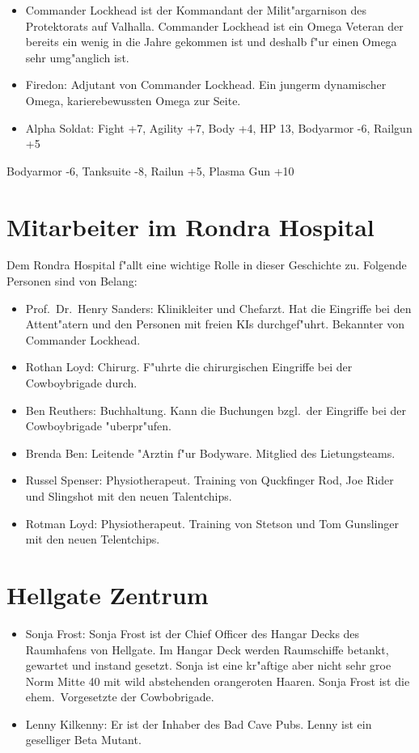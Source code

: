 \begin{itemize}
    \item Commander Lockhead ist der Kommandant der Milit"argarnison des Protektorats auf Valhalla. Commander Lockhead ist ein Omega Veteran der bereits ein wenig in die Jahre gekommen ist und deshalb f"ur einen Omega sehr umg"anglich ist. 
    \item Firedon: Adjutant von Commander Lockhead. Ein jungerm dynamischer Omega, karierebewussten Omega zur Seite.
    \item Alpha Soldat: Fight +7, Agility +7, Body +4, HP 13, Bodyarmor -6, Railgun +5
\end{itemize}

Bodyarmor -6, Tanksuite -8, Railun +5, Plasma Gun +10

\section{Mitarbeiter im Rondra Hospital}

Dem Rondra Hospital f"allt eine wichtige Rolle in dieser Geschichte zu. Folgende Personen sind von Belang:

\begin{itemize}
    \item Prof.~Dr.~Henry Sanders: Klinikleiter und Chefarzt. Hat die Eingriffe bei den Attent"atern und den Personen mit freien KIs durchgef"uhrt. Bekannter von Commander Lockhead.
    \item Rothan Loyd: Chirurg. F"uhrte die chirurgischen Eingriffe bei der Cowboybrigade durch.
    \item Ben Reuthers: Buchhaltung. Kann die Buchungen bzgl.~der Eingriffe bei der Cowboybrigade "uberpr"ufen.
    \item Brenda Ben: Leitende "Arztin f"ur Bodyware. Mitglied des Lietungsteams.
    \item Russel Spenser: Physiotherapeut. Training von Quckfinger Rod, Joe Rider und Slingshot mit den neuen Talentchips.
    \item Rotman Loyd: Physiotherapeut. Training von Stetson und Tom Gunslinger mit den neuen Telentchips.    
\end{itemize}

\section{Hellgate Zentrum}

\begin{itemize}
    \item Sonja Frost: Sonja Frost ist der Chief Officer des Hangar Decks des Raumhafens von Hellgate. Im Hangar Deck werden Raumschiffe betankt, gewartet und instand gesetzt. Sonja ist eine kr"aftige aber nicht sehr gro\3e Norm Mitte 40 mit wild abstehenden orangeroten Haaren. Sonja Frost ist die ehem.~Vorgesetzte der Cowbobrigade.
    \item Lenny Kilkenny: Er ist der Inhaber des Bad Cave Pubs. Lenny ist ein geselliger Beta Mutant.
\end{itemize}

